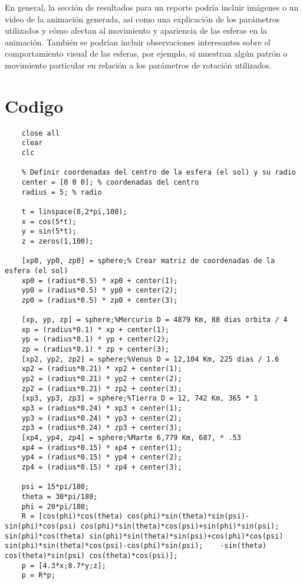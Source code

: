 \documentclass[12pt]{article}
\begin{document}
	En general, la sección de resultados para un reporte podría incluir imágenes o un video de la animación generada, así como una explicación de los parámetros utilizados y cómo afectan al movimiento y apariencia de las esferas en la animación. También se podrían incluir observaciones interesantes sobre el comportamiento visual de las esferas, por ejemplo, si muestran algún patrón o movimiento particular en relación a los parámetros de rotación utilizados.
	
	\section{Codigo}
	
	\begin{lstlisting}
	close all
	clear
	clc
	
	% Definir coordenadas del centro de la esfera (el sol) y su radio
	center = [0 0 0]; % coordenadas del centro
	radius = 5; % radio
	
	t = linspace(0,2*pi,100);
	x = cos(5*t);
	y = sin(5*t);
	z = zeros(1,100);
	
	[xp0, yp0, zp0] = sphere;% Crear matriz de coordenadas de la esfera (el sol)
	xp0 = (radius*0.5) * xp0 + center(1);
	yp0 = (radius*0.5) * yp0 + center(2);
	zp0 = (radius*0.5) * zp0 + center(3);
	
	[xp, yp, zp] = sphere;%Mercurio D = 4879 Km, 88 dias orbita / 4
	xp = (radius*0.1) * xp + center(1);
	yp = (radius*0.1) * yp + center(2);
	zp = (radius*0.1) * zp + center(3);
	[xp2, yp2, zp2] = sphere;%Venus D = 12,104 Km, 225 dias / 1.6
	xp2 = (radius*0.21) * xp2 + center(1);
	yp2 = (radius*0.21) * yp2 + center(2);
	zp2 = (radius*0.21) * zp2 + center(3);
	[xp3, yp3, zp3] = sphere;%Tierra D = 12, 742 Km, 365 * 1
	xp3 = (radius*0.24) * xp3 + center(1);
	yp3 = (radius*0.24) * yp3 + center(2);
	zp3 = (radius*0.24) * zp3 + center(3);
	[xp4, yp4, zp4] = sphere;%Marte 6,779 Km, 687, * .53
	xp4 = (radius*0.15) * xp4 + center(1);
	yp4 = (radius*0.15) * yp4 + center(2);
	zp4 = (radius*0.15) * zp4 + center(3);
	
	psi = 15*pi/180;
	theta = 30*pi/180;
	phi = 20*pi/180;
	R = [cos(phi)*cos(theta) cos(phi)*sin(theta)*sin(psi)-sin(phi)*cos(psi) cos(phi)*sin(theta)*cos(psi)+sin(phi)*sin(psi);    sin(phi)*cos(theta) sin(phi)*sin(theta)*sin(psi)+cos(phi)*cos(psi) sin(phi)*sin(theta)*cos(psi)-cos(phi)*sin(psi);    -sin(theta) cos(theta)*sin(psi) cos(theta)*cos(psi)];
	p = [4.3*x;8.7*y;z];
	p = R*p;
	

\end{lstlisting}
\end{document}
